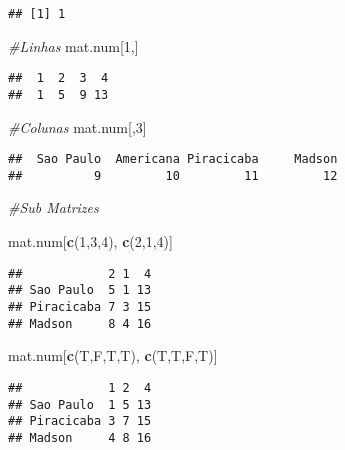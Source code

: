 \documentclass[]{article}
\newenvironment{Shaded}{\begin{snugshade}}{\end{snugshade}}
\newcommand{\KeywordTok}[1]{\textcolor[rgb]{0.13,0.29,0.53}{\textbf{#1}}}
\newcommand{\DecValTok}[1]{\textcolor[rgb]{0.00,0.00,0.81}{#1}}
\newcommand{\CommentTok}[1]{\textcolor[rgb]{0.56,0.35,0.01}{\textit{#1}}}
\newcommand{\NormalTok}[1]{#1}
\begin{document}
\begin{verbatim}
## [1] 1
\end{verbatim}

\begin{Shaded}
\begin{Highlighting}[]
\CommentTok{#Linhas }
\NormalTok{mat.num[}\DecValTok{1}\NormalTok{,]}
\end{Highlighting}
\end{Shaded}

\begin{verbatim}
##  1  2  3  4 
##  1  5  9 13
\end{verbatim}

\begin{Shaded}
\begin{Highlighting}[]
\CommentTok{#Colunas}
\NormalTok{mat.num[,}\DecValTok{3}\NormalTok{]}
\end{Highlighting}
\end{Shaded}

\begin{verbatim}
##  Sao Paulo  Americana Piracicaba     Madson 
##          9         10         11         12
\end{verbatim}

\begin{Shaded}
\begin{Highlighting}[]
\CommentTok{#Sub Matrizes}

\NormalTok{mat.num[}\KeywordTok{c}\NormalTok{(}\DecValTok{1}\NormalTok{,}\DecValTok{3}\NormalTok{,}\DecValTok{4}\NormalTok{), }\KeywordTok{c}\NormalTok{(}\DecValTok{2}\NormalTok{,}\DecValTok{1}\NormalTok{,}\DecValTok{4}\NormalTok{)]}
\end{Highlighting}
\end{Shaded}

\begin{verbatim}
##            2 1  4
## Sao Paulo  5 1 13
## Piracicaba 7 3 15
## Madson     8 4 16
\end{verbatim}

\begin{Shaded}
\begin{Highlighting}[]
\NormalTok{mat.num[}\KeywordTok{c}\NormalTok{(T,F,T,T), }\KeywordTok{c}\NormalTok{(T,T,F,T)]}
\end{Highlighting}
\end{Shaded}

\begin{verbatim}
##            1 2  4
## Sao Paulo  1 5 13
## Piracicaba 3 7 15
## Madson     4 8 16
\end{verbatim}
\end{document}
